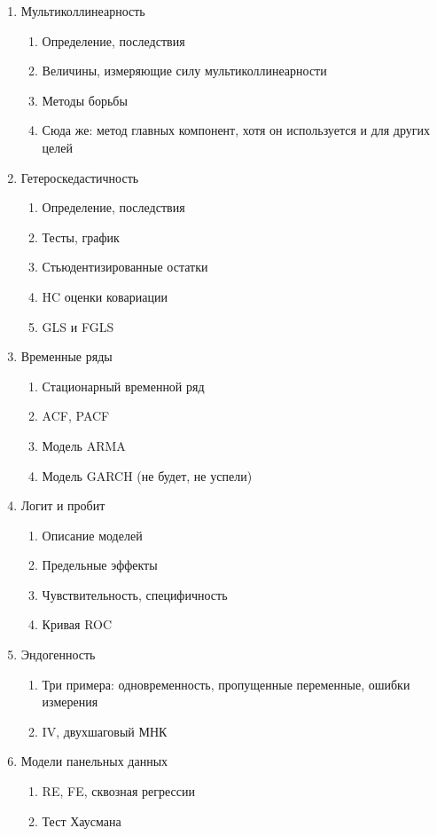 \documentclass[12pt, a4paper]{article}\usepackage[]{graphicx}\usepackage[]{color}
\begin{document}
\begin{enumerate}
\item Мультиколлинеарность
\begin{enumerate}
\item Определение, последствия
\item Величины, измеряющие силу мультиколлинеарности
\item Методы борьбы
\item Сюда же: метод главных компонент, хотя он используется и для других целей
\end{enumerate}


\item Гетероскедастичность
\begin{enumerate}
\item Определение, последствия
\item Тесты, график
\item Стьюдентизированные остатки
\item HC оценки ковариации
\item GLS и FGLS
\end{enumerate}

\item Временные ряды
\begin{enumerate}
\item Стационарный временной ряд
\item ACF, PACF
\item Модель ARMA
\item Модель GARCH (не будет, не успели)
\end{enumerate}


\item Логит и пробит
\begin{enumerate}
\item Описание моделей
\item Предельные эффекты
\item Чувствительность, специфичность
\item Кривая ROC
\end{enumerate}

\item Эндогенность
\begin{enumerate}
\item Три примера: одновременность, пропущенные переменные, ошибки измерения
\item IV, двухшаговый МНК
\end{enumerate}


\item Модели панельных данных
\begin{enumerate}
\item  RE, FE, сквозная регрессии
\item  Тест Хаусмана
\end{enumerate}


\end{enumerate}
\end{document}
